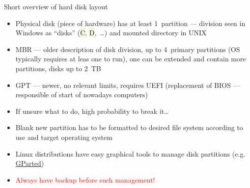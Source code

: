 \documentclass[compress, ucs, xelatex, 11pt, xcolor=svgnames, aspectratio=169,
	hyperref={
		bookmarks=true,
		unicode=true,
		colorlinks=true,
		pdftitle={Linux, command line and MetaCentrum},
		plainpages=false,
		pdfauthor={Vojtech Zeisek},
		pdfsubject={Course about use of Linux command line, writing shell scripts and using MetaCentrum of CESNET},
		pdfcreator={XeLaTeX},
		pdfkeywords={Linux, GNU, BASH, shell, command line, MetaCentrum},
		linkcolor=DarkRed, %
		anchorcolor=DarkBlue, %
		citecolor=Indigo, %
		filecolor=NavyBlue, %
		menucolor=DarkMagenta, %
		urlcolor=DarkBlue, %
		pdftex},
	url={hyphens, lowtilde} %
	]{beamer}
\renewcommand{\texttt}[1]{\colorbox{Beige}{{\ttfamily #1}}}
\renewcommand{\alert}[1]{\textcolor{red}{#1}}
\begin{document}
\begin{frame}{Short overview of hard disk layout}
	\begin{itemize}
		\item Physical disk (piece of hardware) has at least 1~partition --- division seen in Windows as \enquote{disks} (\texttt{C}, \texttt{D},~\ldots) and mounted directory in UNIX
		\item MBR --- older description of disk division, up to 4~primary partitions (OS typically requires at leas one to run), one can be extended and contain more partitions, disks up to 2~TB
		\item GPT --- newer, no relevant limits, requires UEFI (replacement of BIOS --- responsible of start of nowadays computers)
		\item If unsure what to do, high probability to break it\ldots
		\item Blank new partition has to be formatted to desired file system according to use and target operating system
		\item Linux distributions have easy graphical tools to manage disk partitions (e.g. \href{https://gparted.org/}{GParted})
		\item \alert{Always have backup before such management!}
	\end{itemize}
\end{frame}
\end{document}
